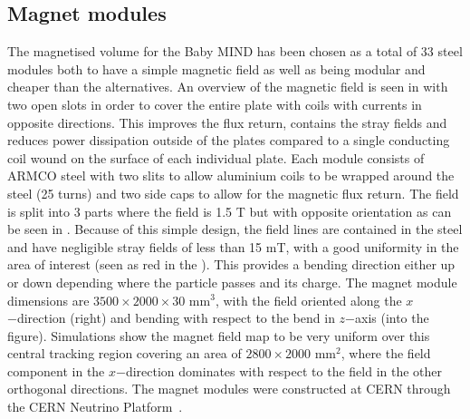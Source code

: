 

\subsection{Magnet modules}

The magnetised volume for the Baby MIND has been chosen as a total of 33 steel modules both to have a simple magnetic field as well as being modular and cheaper than the alternatives. An overview of the magnetic field is seen in  with two open slots in order to cover the entire plate with coils with currents in opposite directions. This improves the flux return, contains the stray fields and reduces power dissipation outside of the plates compared to a single conducting coil wound on the surface of each individual plate. Each module consists of ARMCO steel with two slits to allow aluminium coils to be wrapped around the steel (25 turns) and two side caps to allow for the magnetic flux return. The field is split into 3 parts where the field is 1.5 T but with opposite orientation as can be seen in . Because of this simple design, the field lines are contained in the steel and have negligible stray fields of less than 15 mT, with a good uniformity in the area of interest (seen as red in the ). This provides a bending direction either up or down depending where the particle passes and its charge. The magnet module dimensions are $3500 \times 2000 \times 30$ mm$^3$, with the field oriented along the $x$−direction (right) and bending with respect to the bend in $z$−axis (into the figure). Simulations show the magnet field map to be very uniform over this central tracking region covering an area of $2800 \times 2000$ mm$^2$, where the field component in the $x$−direction dominates with respect to the field in the other orthogonal directions. The magnet modules were constructed at CERN through the CERN Neutrino Platform~\cite{50MagnetMIND}.

